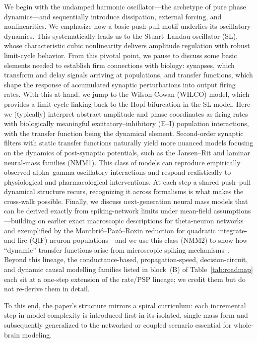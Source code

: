 \documentclass[12pt]{article}
\numberwithin{equation}{section}
\newcommand{\rev}[1]{\begingroup\color{blue}#1\endgroup}
\begin{document}
We begin with the undamped harmonic oscillator—the archetype of pure phase dynamics—and sequentially introduce dissipation, external forcing, and nonlinearities. We emphasize how a basic push-pull motif underlies its oscillatory dynamics.  This systematically leads us to the Stuart–Landau oscillator (SL), whose characteristic cubic nonlinearity delivers amplitude regulation with robust limit-cycle behavior. From this pivotal point, we pause to discuss some basic elements needed to establish firm connections with biology: synapses, which transform and delay signals arriving at populations, and transfer functions, which shape the response of accumulated synaptic perturbations into output firing rates. 
With this at hand, we jump to the Wilson-Cowan (WILCO) model, which provides a limit cycle linking back to the Hopf bifurcation in the SL model. Here we (typically) interpret abstract amplitude and phase coordinates as firing rates with biologically meaningful excitatory–inhibitory (E–I) population interactions, with the transfer function being the dynamical element. 
Second-order synaptic filters with static transfer functions naturally yield more nuanced models focusing on the dynamics of post-synaptic potentials, such as the Jansen–Rit and laminar neural-mass families (NMM1). This class of models can reproduce empirically observed alpha–gamma oscillatory interactions and respond realistically to physiological and pharmacological interventions.  \rev{At each step a shared push--pull dynamical structure recurs, recognizing it across formalisms is what makes the cross-walk possible.  Finally, we discuss next-generation neural mass models that can be derived exactly from spiking-network limits under mean-field assumptions—building on earlier exact macroscopic descriptions for theta-neuron networks and exemplified by the Montbrió–Pazó–Roxin reduction for quadratic integrate-and-fire (QIF) neuron  populations—and we use this class (NMM2) to show how ``dynamic'' transfer functions arise from microscopic spiking mechanisms~\cite{Montbrio:2015aa,so2014networks,luke2013complete}. Beyond this lineage, the conductance-based, propagation-speed, decision-circuit, and dynamic causal modelling families listed in block~(B) of Table~\ref{tab:roadmap} each sit at a one-step extension of the rate/PSP lineage; we credit them but do not re-derive them in detail.}




To this end, the paper's structure mirrors a spiral curriculum: each incremental step in model complexity is introduced first in its isolated, single-mass form and subsequently generalized to the networked or coupled scenario essential for whole-brain modeling. 
\end{document}
